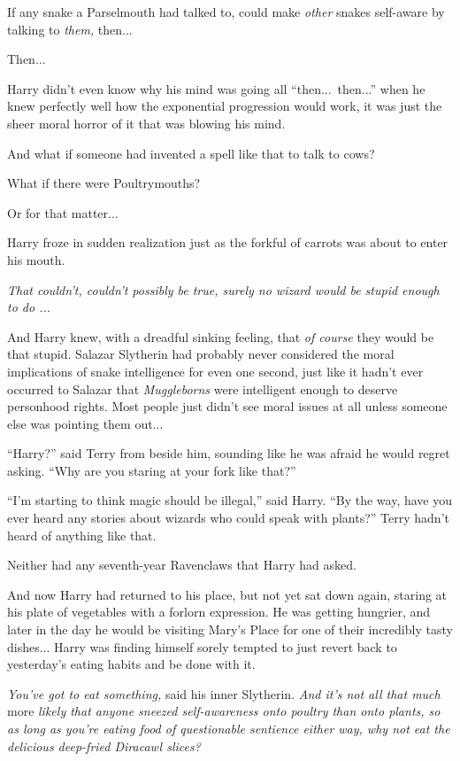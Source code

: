 If any snake a Parselmouth had talked to, could make \emph{other} snakes self-aware by talking to \emph{them,} then...

Then...

Harry didn’t even know why his mind was going all “then...\ then...” when he knew perfectly well how the exponential progression would work, it was just the sheer moral horror of it that was blowing his mind.

And what if someone had invented a spell like that to talk to cows?

What if there were Poultrymouths?

Or for that matter...

Harry froze in sudden realization just as the forkful of carrots was about to enter his mouth.

\emph{That couldn’t, couldn’t possibly be true, surely no wizard would be stupid enough to do ...}

And Harry knew, with a dreadful sinking feeling, that \emph{of course} they would be that stupid. Salazar Slytherin had probably never considered the moral implications of snake intelligence for even one second, just like it hadn’t ever occurred to Salazar that \emph{Muggleborns} were intelligent enough to deserve personhood rights. Most people just didn’t see moral issues at all unless someone else was pointing them out...

“Harry?” said Terry from beside him, sounding like he was afraid he would regret asking. “Why are you staring at your fork like that?”

“I’m starting to think magic should be illegal,” said Harry. “By the way, have you ever heard any stories about wizards who could speak with plants?”
\sbreak
Terry hadn’t heard of anything like that.

Neither had any seventh-year Ravenclaws that Harry had asked.

And now Harry had returned to his place, but not yet sat down again, staring at his plate of vegetables with a forlorn expression. He was getting hungrier, and later in the day he would be visiting Mary’s Place for one of their incredibly tasty dishes... Harry was finding himself sorely tempted to just revert back to yesterday’s eating habits and be done with it.

\emph{You’ve got to eat something,} said his inner Slytherin.\emph{ And it’s not all that much} more\emph{ likely that anyone sneezed self-awareness onto poultry than onto plants, so as long as you’re eating food of questionable sentience either way, why not eat the delicious deep-fried Diracawl slices?}

